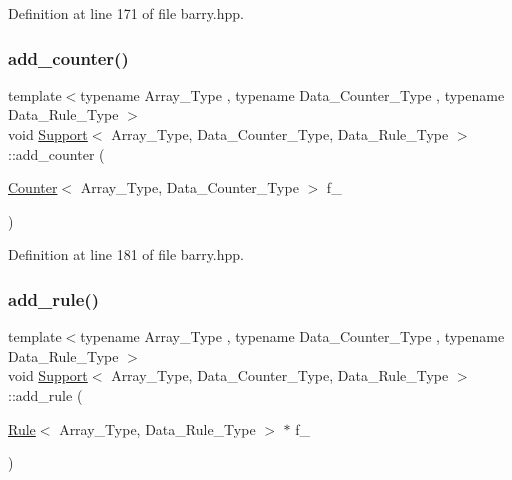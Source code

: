 Definition at line 171 of file barry.\+hpp.

\mbox{\label{classbarry_1_1_support_a00d511970c0bf833ef8bdd7580c670cc}} 
\subsubsection{\texorpdfstring{add\+\_\+counter()}{add\_counter()}\hspace{0.1cm}{\footnotesize\ttfamily [2/2]}}
{\footnotesize\ttfamily template$<$typename Array\+\_\+\+Type , typename Data\+\_\+\+Counter\+\_\+\+Type , typename Data\+\_\+\+Rule\+\_\+\+Type $>$ \\
void \hyperlink{classbarry_1_1_support}{Support}$<$ Array\+\_\+\+Type, Data\+\_\+\+Counter\+\_\+\+Type, Data\+\_\+\+Rule\+\_\+\+Type $>$\+::add\+\_\+counter (\begin{DoxyParamCaption}\item[{\hyperlink{classbarry_1_1_counter}{Counter}$<$ Array\+\_\+\+Type, Data\+\_\+\+Counter\+\_\+\+Type $>$}]{f\+\_\+ }\end{DoxyParamCaption})\hspace{0.3cm}{\ttfamily [inline]}}



Definition at line 181 of file barry.\+hpp.

\mbox{\label{classbarry_1_1_support_a3113a4586c541aa25db7b4a864b748a2}} 
\subsubsection{\texorpdfstring{add\+\_\+rule()}{add\_rule()}\hspace{0.1cm}{\footnotesize\ttfamily [1/2]}}
{\footnotesize\ttfamily template$<$typename Array\+\_\+\+Type , typename Data\+\_\+\+Counter\+\_\+\+Type , typename Data\+\_\+\+Rule\+\_\+\+Type $>$ \\
void \hyperlink{classbarry_1_1_support}{Support}$<$ Array\+\_\+\+Type, Data\+\_\+\+Counter\+\_\+\+Type, Data\+\_\+\+Rule\+\_\+\+Type $>$\+::add\+\_\+rule (\begin{DoxyParamCaption}\item[{\hyperlink{classbarry_1_1_rule}{Rule}$<$ Array\+\_\+\+Type, Data\+\_\+\+Rule\+\_\+\+Type $>$ $\ast$}]{f\+\_\+ }\end{DoxyParamCaption})\hspace{0.3cm}{\ttfamily [inline]}}




